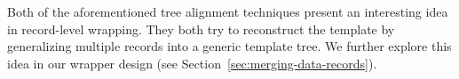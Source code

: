 Both of the aforementioned tree alignment techniques present an interesting idea in record-level wrapping. They both try to reconstruct the template by generalizing multiple records into a generic template tree. We further explore this idea in our wrapper design (see Section~\ref{sec:merging-data-records}).


